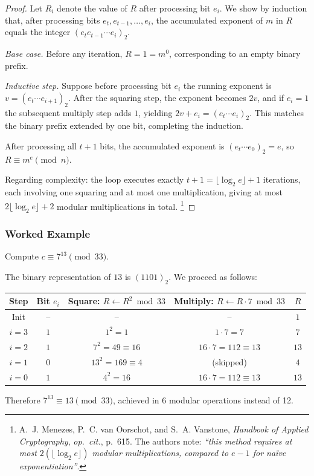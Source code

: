 \begin{proof}
Let $R_i$ denote the value of $R$ after processing bit $e_i$. We show by induction that,
after processing bits $e_t, e_{t-1}, \ldots, e_i$, the accumulated exponent of $m$ in $R$
equals the integer $(e_t e_{t-1} \cdots e_i)_2$.

\textit{Base case.} Before any iteration, $R = 1 = m^0$, corresponding to an empty
binary prefix.

\textit{Inductive step.} Suppose before processing bit $e_i$ the running exponent is
$v = (e_t \cdots e_{i+1})_2$. After the squaring step, the exponent becomes $2v$, and
if $e_i = 1$ the subsequent multiply step adds $1$, yielding $2v + e_i = (e_t \cdots e_i)_2$.
This matches the binary prefix extended by one bit, completing the induction.

After processing all $t+1$ bits, the accumulated exponent is $(e_t \cdots e_0)_2 = e$,
so $R \equiv m^e \pmod{n}$.

Regarding complexity: the loop executes exactly $t+1 = \lfloor\log_2 e\rfloor + 1$
iterations, each involving one squaring and at most one multiplication, giving at most
$2\lfloor\log_2 e\rfloor + 2$ modular multiplications in total.%
\footnote{A.~J. Menezes, P.~C. van Oorschot, and S.~A. Vanstone,
\textit{Handbook of Applied Cryptography}, \textit{op.\ cit.}, p.~615.
The authors note: \textit{``this method requires at most $2(\lfloor\log_2 e\rfloor)$
modular multiplications, compared to $e-1$ for naïve exponentiation''}.}
\end{proof}

\subsubsection*{Worked Example}

\begin{example}
Compute $c \equiv 7^{13} \pmod{33}$.

The binary representation of $13$ is $(1101)_2$. We proceed as follows:

\begin{center}
\begin{tabular}{ccccc}
\toprule
Step & Bit $e_i$ & Square: $R \leftarrow R^2 \bmod 33$ & Multiply: $R \leftarrow R \cdot 7 \bmod 33$ & $R$ \\
\midrule
Init  &   --   & --                    & --                       & $1$  \\
$i=3$ &   $1$  & $1^2 = 1$             & $1 \cdot 7 = 7$          & $7$  \\
$i=2$ &   $1$  & $7^2 = 49 \equiv 16$  & $16 \cdot 7 = 112 \equiv 13$ & $13$ \\
$i=1$ &   $0$  & $13^2 = 169 \equiv 4$ & (skipped)                & $4$  \\
$i=0$ &   $1$  & $4^2 = 16$            & $16 \cdot 7 = 112 \equiv 13$ & $13$ \\
\bottomrule
\end{tabular}
\end{center}

Therefore $7^{13} \equiv 13 \pmod{33}$, achieved in 6 modular operations instead of 12.
\end{example}
\newpage
